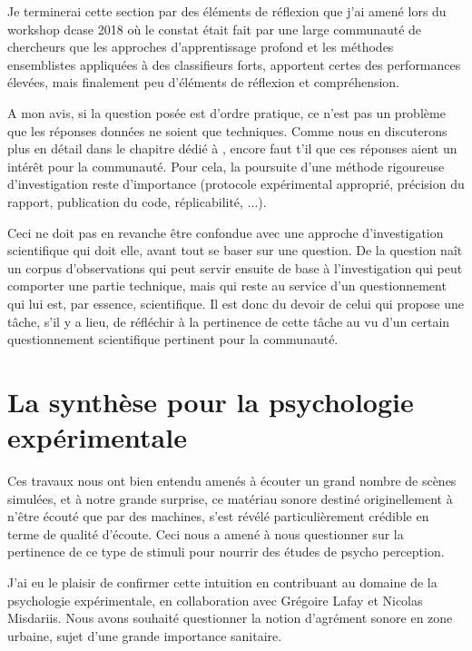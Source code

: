 Je terminerai cette section par des éléments de réflexion que j'ai amené lors du workshop dcase 2018 où le constat était fait par une large communauté de chercheurs que les approches d'apprentissage profond et les méthodes ensemblistes appliquées à des classifieurs forts, apportent certes des performances élevées, mais finalement peu d'éléments de réflexion et compréhension.

A mon avis, si la question posée est d'ordre pratique, ce n'est pas un problème que les réponses données ne soient que techniques. Comme nous en discuterons plus en détail dans le chapitre dédié à , encore faut t'il que ces réponses aient un intérêt pour la communauté. Pour cela, la poursuite d'une méthode rigoureuse d'investigation reste d'importance (protocole expérimental approprié, précision du rapport, publication du code, réplicabilité, ...).

Ceci ne doit pas en revanche être confondue avec une approche d'investigation scientifique qui doit elle, avant tout se baser sur une question. De la question naît un corpus d'observations qui peut servir ensuite de base à l'investigation qui peut comporter une partie technique, mais qui reste au service d'un questionnement qui lui est, par essence, scientifique. Il est donc du devoir de celui qui propose une tâche, s'il y a lieu, de réfléchir à la pertinence de cette tâche au vu d'un certain questionnement scientifique pertinent pour la communauté.

\section{ \nmu La  synthèse pour la psychologie expérimentale} \label{sec:psycho}

Ces travaux nous ont bien entendu amenés à écouter un grand nombre de scènes simulées, et à notre grande surprise, ce matériau sonore destiné originellement à n'être écouté que par des machines, s'est révélé particulièrement crédible en terme de qualité d'écoute. Ceci nous a amené à nous questionner sur la pertinence de ce type de stimuli pour nourrir des études de psycho perception.

J'ai eu le plaisir de confirmer cette intuition en contribuant au domaine de la psychologie expérimentale, en collaboration avec Grégoire Lafay et Nicolas Misdariis. Nous avons souhaité questionner la notion d'agrément sonore en zone urbaine, sujet d'une grande importance sanitaire.

